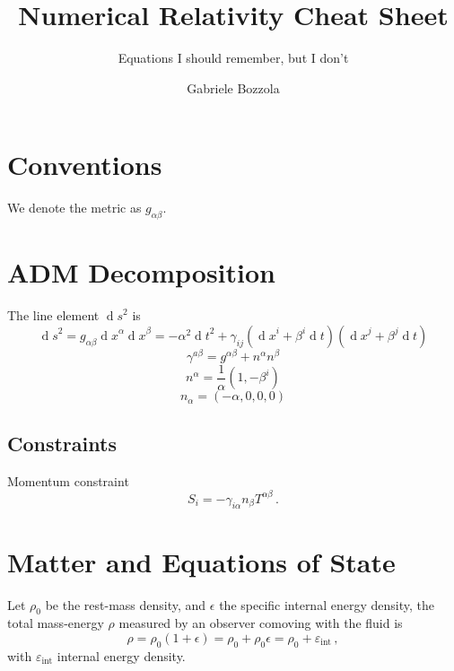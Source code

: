 \documentclass[]{scrartcl}
\author{Gabriele Bozzola}
\title{Numerical Relativity Cheat Sheet}
\date{}
\subtitle{Equations I should remember, but I don't}
\renewcommand{\d}[1]{\ensuremath{\operatorname{d}\!{#1}}}
\begin{document}
\maketitle
\tableofcontents

\section{Conventions}
\label{sec:conventions}

We denote the metric as $g_{\alpha\beta}$.

\section{ADM Decomposition}
\label{sec:adm-decomposition}

The line element $\d s^2$ is
\begin{equation}
  \label{eq:2}
  \d s^2 = g_{\alpha\beta} \d x^\alpha \d x^\beta = - \alpha^2 \d t^2 + \gamma_{ij} (\d x^i + \beta^i \d t) (\d x^j + \beta^j \d t)
\end{equation}
\begin{equation}
  \label{eq:11}
  \gamma^{a\beta} = g^{\alpha\beta} + n^\alpha n^\beta
\end{equation}
\begin{equation}
  \label{eq:4}
  n^\alpha = \frac{1}{\alpha} (1, - \beta^i)
\end{equation}
\begin{equation}
  \label{eq:5}
  n_\alpha = (-\alpha,0,0,0)
\end{equation}

\subsection{Constraints}
\label{sec:constraints}

Momentum constraint
\begin{equation}
  \label{eq:9}
  S_i = - \gamma_{i\alpha} n_\beta T^{\alpha\beta}\,.
\end{equation}

\section{Matter and Equations of State}
\label{sec:matter}

Let $\rho_0$ be the rest-mass density, and $\epsilon$ the specific internal energy
density, the total mass-energy $\rho$ measured by an observer comoving with the
fluid is
\begin{equation}
  \label{eq:6}
  \rho = \rho_0 (1 + \epsilon) = \rho_0 + \rho_0 \epsilon = \rho_0 + \varepsilon_{\text{int}}\,,
\end{equation}
with $\varepsilon_{\text{int}}$ internal energy density.
\end{document}
